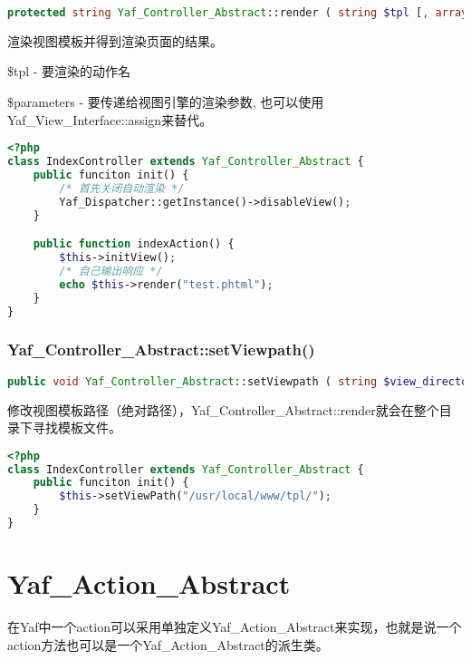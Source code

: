 \begin{lstlisting}[language=PHP]
protected string Yaf_Controller_Abstract::render ( string $tpl [, array $parameters ] )
\end{lstlisting}

渲染视图模板并得到渲染页面的结果。


\begin{compactitem}
\item \$tpl - 要渲染的动作名
\item \$parameters - 要传递给视图引擎的渲染参数, 也可以使用Yaf\_View\_Interface::assign来替代。
\end{compactitem}

\begin{lstlisting}[language=PHP]
<?php
class IndexController extends Yaf_Controller_Abstract {
    public funciton init() {
        /* 首先关闭自动渲染 */
        Yaf_Dispatcher::getInstance()->disableView();
    }

    public function indexAction() {
        $this->initView();
        /* 自己输出响应 */
        echo $this->render("test.phtml");
    }
}
\end{lstlisting}


\subsection{Yaf\_Controller\_Abstract::setViewpath()}


\begin{lstlisting}[language=PHP]
public void Yaf_Controller_Abstract::setViewpath ( string $view_directory )
\end{lstlisting}

修改视图模板路径（绝对路径），Yaf\_Controller\_Abstract::render就会在整个目录下寻找模板文件。



\begin{lstlisting}[language=PHP]
<?php
class IndexController extends Yaf_Controller_Abstract {
    public funciton init() {
        $this->setViewPath("/usr/local/www/tpl/");
    }
}
\end{lstlisting}



\chapter{Yaf\_Action\_Abstract}


在Yaf中一个action可以采用单独定义Yaf\_Action\_Abstract来实现，也就是说一个action方法也可以是一个Yaf\_Action\_Abstract的派生类。

